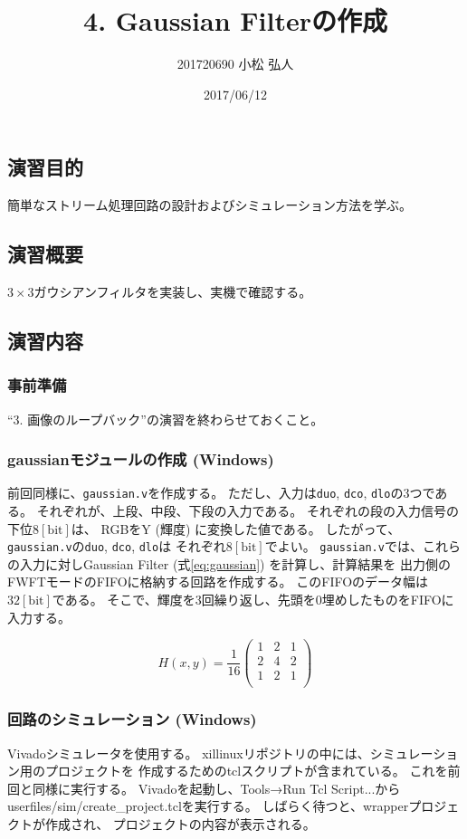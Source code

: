 \documentclass[11pt]{jsarticle}
\title{4. Gaussian Filterの作成}
\author{201720690 小松 弘人}
\date{2017/06/12}
\begin{document}
\maketitle
\subsection*{演習目的}
簡単なストリーム処理回路の設計およびシミュレーション方法を学ぶ。

\subsection*{演習概要}
$3\!\times\!3$ガウシアンフィルタを実装し、実機で確認する。

\subsection*{演習内容}
\subsubsection*{事前準備}
``3. 画像のループバック''の演習を終わらせておくこと。

\subsubsection*{gaussianモジュールの作成 (Windows)}
前回同様に、\verb|gaussian.v|を作成する。
ただし、入力は\verb|duo|, \verb|dco|, \verb|dlo|の3つである。
それぞれが、上段、中段、下段の入力である。
それぞれの段の入力信号の下位$8\mathrm{[bit]}$は、
RGBをY (輝度) に変換した値である。
したがって、\verb|gaussian.v|の\verb|duo|, \verb|dco|, \verb|dlo|は
それぞれ$8\mathrm{[bit]}$でよい。
\verb|gaussian.v|では、これらの入力に対しGaussian Filter
(式\ref{eq:gaussian}) を計算し、計算結果を
出力側のFWFTモードのFIFOに格納する回路を作成する。
このFIFOのデータ幅は$32\mathrm{[bit]}$である。
そこで、輝度を3回繰り返し、先頭を0埋めしたものをFIFOに入力する。

\begin{equation}
	\label{eq:gaussian}
	H(x, y)\!=\!\frac{1}{16}\!\left(
	\begin{array}{ccc}
		1 & 2 & 1 \\
		2 & 4 & 2 \\
		1 & 2 & 1 \\
	\end{array}
	\right)
\end{equation}

\subsubsection*{回路のシミュレーション (Windows)}
Vivadoシミュレータを使用する。
xillinuxリポジトリの中には、シミュレーション用のプロジェクトを
作成するためのtclスクリプトが含まれている。
これを前回と同様に実行する。
Vivadoを起動し、Tools→Run Tcl Script...から
userfiles/sim/create\_project.tclを実行する。
しばらく待つと、wrapperプロジェクトが作成され、
プロジェクトの内容が表示される。
\end{document}
